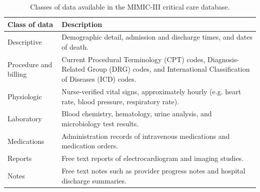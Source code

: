 \documentclass[english]{article}
\begin{document}
\begin{center}
\begin{table}
\begin{tabular}{|l|p{8cm}|}
    \hline
    Class of data & Description \\
    \hline
    Descriptive & Demographic detail, admission and discharge times, and dates of death. \\
    \hline
    Procedure and billing & Current Procedural Terminology (CPT) codes, Diagnosis-Related Group (DRG) codes, and International Classification of Diseases (ICD) codes. \\
    \hline
    Physiologic & Nurse-verified vital signs, approximately hourly (e.g. heart rate, blood pressure, respiratory rate). \\
    \hline
    Laboratory & Blood chemistry, hematology, urine analysis, and microbiology test results. \\
    \hline
    Medications & Administration records of intravenous medications and medication orders. \\
    \hline
    Reports & Free text reports of electrocardiogram and imaging studies. \\
    \hline
    Notes & Free text notes such as provider progress notes and hospital discharge summaries. \\
    \hline
\end{tabular}
\caption{Classes of data available in the MIMIC-III critical care database.}
\label{table:dataclasses}
\end{table}
\end{center}
\end{document}
